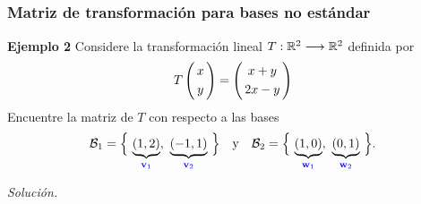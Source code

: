 {\begin{frame}
\end{frame}
}


\subsection{}

\begin{frame}\frametitle{Matriz de transformación para bases no estándar}
	
	\begin{ej}{\textbf{Ejemplo 2 }}
		\justifying
		Considere la transformación lineal  $T:\mathbb{R}^2\longrightarrow\mathbb{R}^2$ definida por 
		\[
		T
		\left(
		\begin{array}{@{\hspace{0.3\tabcolsep}}c@{\hspace{0.3\tabcolsep}}}
		x  \\[1mm]
		y  
		\end{array}
		\right)
		=
		\left(
		\begin{array}{@{\hspace{0.3\tabcolsep}}c@{\hspace{0.3\tabcolsep}}}
		x+y  \\[1mm]
		2x-y 
		\end{array}
		\right)
		\]
		Encuentre la matriz de $T$ con respecto a las bases 
		\[
		\mathcal{B}_1 = \Big\{ \, \underbrace{(1,2)}_{\color{blue}\mathbf{v}_1}, \ \underbrace{(-1,1)}_{\color{blue}\mathbf{v}_2} \, \Big\} \quad \text{y} \quad 
		\mathcal{B}_2 = \Big\{ \, \underbrace{(1,0)}_{\color{blue}\mathbf{w}_1}, \ \underbrace{(0,1)}_{\color{blue}\mathbf{w}_2} \, \Big\}.
		\]
	\end{ej}
	\textit{Solución.}
	
\end{frame}


\subsection{}

